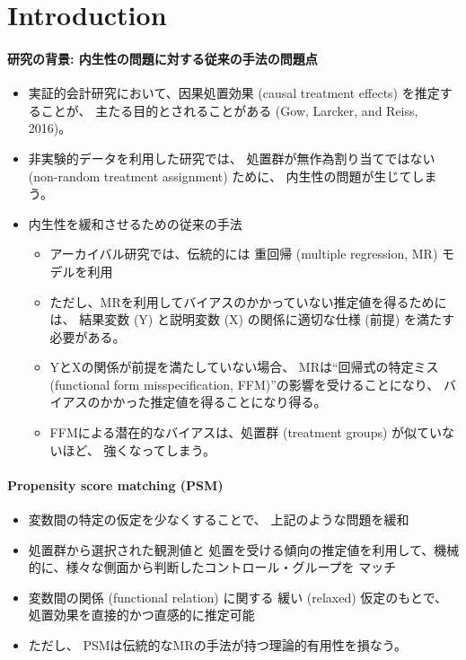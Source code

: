 \section{Introduction}

\paragraph{研究の背景: 内生性の問題に対する従来の手法の問題点}
\begin{itemize}
 \item 実証的会計研究において、因果処置効果 (causal treatment effects) を推定することが、
       主たる目的とされることがある (Gow, Larcker, and Reiss, 2016)。
 \item 非実験的データを利用した研究では、
       処置群が無作為割り当てではない (non-random treatment assignment) ために、
       内生性の問題が生じてしまう。
 \item 内生性を緩和させるための従来の手法
       \begin{itemize}
        \item アーカイバル研究では、伝統的には
              重回帰 (multiple regression, MR) モデルを利用
        \item ただし、MRを利用してバイアスのかかっていない推定値を得るためには、
              結果変数 (Y) と説明変数 (X) の関係に適切な仕様 (前提) を満たす必要がある。
        \item YとXの関係が前提を満たしていない場合、
              MRは``回帰式の特定ミス (functional form misspecification, FFM)''の影響を受けることになり、
              バイアスのかかった推定値を得ることになり得る。
        \item FFMによる潜在的なバイアスは、処置群 (treatment groups) が似ていないほど、
              強くなってしまう。
       \end{itemize}
\end{itemize}

\paragraph{Propensity score matching (PSM)}
\begin{itemize}
 \item 変数間の特定の仮定を少なくすることで、
       上記のような問題を緩和
 \item 処置群から選択された観測値と
       処置を受ける傾向の推定値を利用して、機械的に、様々な側面から判断したコントロール・グループを
       マッチ
 \item 変数間の関係 (functional relation) に関する
       緩い (relaxed) 仮定のもとで、処置効果を直接的かつ直感的に推定可能
 \item ただし、
       PSMは伝統的なMRの手法が持つ理論的有用性を損なう。
\end{itemize}

